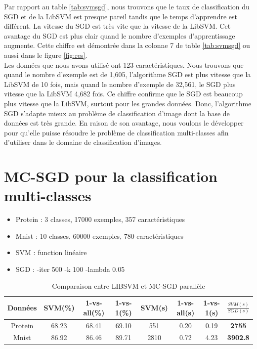 \pagebreak
Par rapport au table \ref{tab:svmsgd}, nous trouvons que le taux de classification du SGD et de la LibSVM est presque pareil tandis que le temps d'apprendre est différent. La vitesse du SGD est très vite que la vitesse de la LibSVM. Cet avantage du SGD est plus clair quand le nombre d'exemples d'apprentissage augmente. Cette chiffre est démontrée dans la colonne 7 de table \ref{tab:svmsgd} ou aussi dans le figure \ref{fig:res}.\\

Les données que nous avons utilisé ont 123 caractéristiques. Nous trouvons que quand le nombre d'exemple est de 1,605, l'algorithme SGD est plus vitesse que la LibSVM de 10 fois, mais quand le nombre d'exemple de 32,561, le SGD plus vitesse que la LibSVM 4,682 fois. Ce chiffre confirme que le SGD est beaucoup plus vitesse que la LibSVM, surtout pour les grandes données. Donc, l'algorithme SGD s'adapte mieux au problème de classification d'image dont la base de données est très grande. En raison de son avantage, nous voulons le développer pour qu'elle puisse résoudre le problème de classification multi-classes afin d'utiliser dans le domaine de classification d'images.

\section{MC-SGD pour la classification multi-classes}
\begin{itemize}
\item Protein : 3 classes, 17000 exemples, 357 caractéristiques
\item Mnist : 10 classes, 60000 exemples, 780 caractéristiques
\item SVM : function linéaire
\item SGD : -iter 500 -k 100 -lambda 0.05
\end{itemize}

\begin{table}[h]
\begin{center}
    \begin{tabular}{ | c | c | c | c | c | c | c | c |}
    \hline
    Données & SVM(\%) & 1-vs-all(\%) & 1-vs-1(\%) & SVM(s) & 1-vs-all(s) & 1-vs-1(s) & $\frac{SVM(s)}{SGD(s)}$ \\ \hline
    
    Protein & 68.23 & 68.41 & 69.10 & 551 & 0.20 & 0.19 & \textbf{2755} \\ \hline
    
    Mnist & 86.92 & 86.46 & 89.71 & 2810 & 0.72 & 4.23 & \textbf{3902.8} \\ \hline
    
    \end{tabular}
\end{center}
\caption{Comparaison entre LIBSVM et MC-SGD parallèle}
\label{tab:pmcsvm}
\end{table}

